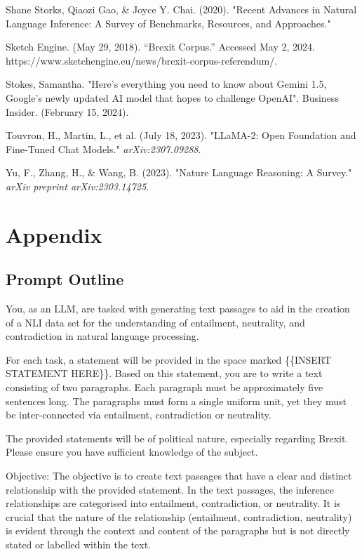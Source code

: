 \documentclass[fleqn,moreauthors,10pt]{ds_report}
\begin{document}
Shane Storks, Qiaozi Gao, \& Joyce Y. Chai. (2020). "Recent Advances in Natural Language Inference: A Survey of Benchmarks, Resources, and Approaches."

Sketch Engine. (May 29, 2018). “Brexit Corpus.” Accessed May 2, 2024. https://www.sketchengine.eu/news/brexit-corpus-referendum/.

Stokes, Samantha. "Here's everything you need to know about Gemini 1.5, Google's newly updated AI model that hopes to challenge OpenAI". Business Insider.  (February 15, 2024).

Touvron, H., Martin, L., et al. (July 18, 2023). "LLaMA-2: Open Foundation and Fine-Tuned Chat Models." \textit{arXiv:2307.09288}.

Yu, F., Zhang, H., \& Wang, B. (2023). "Nature Language Reasoning: A Survey." \textit{arXiv preprint arXiv:2303.14725}.

\vspace{\baselineskip}

\section*{Appendix}

\subsection{Prompt Outline}

You, as an LLM, are tasked with generating text passages to aid in the creation of a NLI data set for the understanding of entailment, neutrality, and contradiction in natural language processing.

For each task, a statement will be provided in the space marked \{\{INSERT STATEMENT HERE\}\}. Based on this statement, you are to write a text consisting of two paragraphs. Each paragraph must be approximately five sentences long. The paragraphs must form a single uniform unit, yet they must be inter-connected via entailment, contradiction or neutrality.

The provided statements will be of political nature, especially regarding Brexit. Please ensure you have sufficient knowledge of the subject.

Objective: The objective is to create text passages that have a clear and distinct relationship with the provided statement. In the text passages, the inference relationships are categorised into entailment, contradiction, or neutrality. It is crucial that the nature of the relationship (entailment, contradiction, neutrality) is evident through the context and content of the paragraphs but is not directly stated or labelled within the text.
\end{document}
